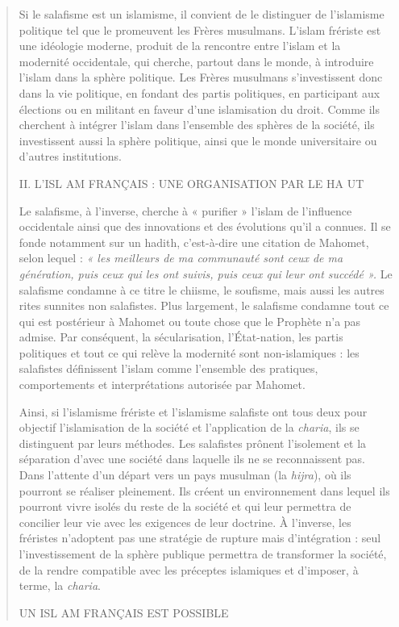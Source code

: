 \begin{quote}
Si le salafisme est un islamisme, il convient de le distinguer de
l'islamisme politique tel que le promeuvent les Frères musulmans.
L'islam frériste est une idéologie moderne, produit de la rencontre
entre l'islam et la modernité occidentale, qui cherche, partout dans le
monde, à introduire l'islam dans la sphère politique. Les Frères
musulmans s'investissent donc dans la vie politique, en fondant des
partis politiques, en participant aux élections ou en militant en faveur
d'une islamisation du droit. Comme ils cherchent à intégrer l'islam dans
l'ensemble des sphères de la société, ils investissent aussi la sphère
politique, ainsi que le monde universitaire ou d'autres institutions.

II. L'ISL AM FRANÇAIS : UNE ORGANISATION PAR LE HA UT

Le salafisme, à l'inverse, cherche à « purifier » l'islam de l'influence
occidentale ainsi que des innovations et des évolutions qu'il a connues.
Il se fonde notamment sur un hadith, c'est-à-dire une citation de
Mahomet, selon lequel : \emph{« les meilleurs de ma communauté sont ceux
de ma génération, puis ceux qui les ont suivis, puis ceux qui leur ont
succédé ».} Le salafisme condamne à ce titre le chiisme, le soufisme,
mais aussi les autres rites sunnites non salafistes. Plus largement, le
salafisme condamne tout ce qui est postérieur à Mahomet ou toute chose
que le Prophète n'a pas admise. Par conséquent, la sécularisation,
l'État-nation, les partis politiques et tout ce qui relève la modernité
sont non-islamiques : les salafistes définissent l'islam comme
l'ensemble des pratiques, comportements et interprétations autorisée par
Mahomet.

Ainsi, si l'islamisme frériste et l'islamisme salafiste ont tous deux
pour objectif l'islamisation de la société et l'application de la
\emph{charia}, ils se distinguent par leurs méthodes. Les salafistes
prônent l'isolement et la séparation d'avec une société dans laquelle
ils ne se reconnaissent pas. Dans l'attente d'un départ vers un pays
musulman (la \emph{hijra}), où ils pourront se réaliser pleinement. Ils
créent un environnement dans lequel ils pourront vivre isolés du reste
de la société et qui leur permettra de concilier leur vie avec les
exigences de leur doctrine. À l'inverse, les fréristes n'adoptent pas
une stratégie de rupture mais d'intégration : seul l'investissement de
la sphère publique permettra de transformer la société, de la rendre
compatible avec les préceptes islamiques et d'imposer, à terme, la
\emph{charia}.

UN ISL AM FRANÇAIS EST POSSIBLE
\end{quote}

